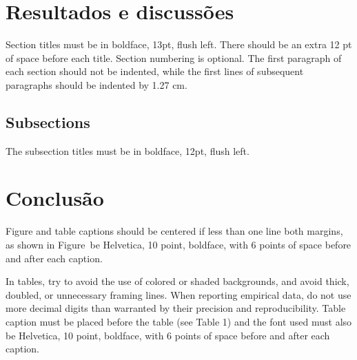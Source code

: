 \documentclass[12pt]{article}
\begin{document}
\section{Resultados e discussões}

Section titles must be in boldface, 13pt, flush left. There should be an extra
12 pt of space before each title. Section numbering is optional. The first
paragraph of each section should not be indented, while the first lines of
subsequent paragraphs should be indented by 1.27 cm.

\subsection{Subsections}

The subsection titles must be in boldface, 12pt, flush left.

\section{Conclusão}\label{sec:figs}

Figure and table captions should be centered if less than one line
both margins, as shown in Figure~be Helvetica, 10 point, boldface, with 6
points of space before and after each caption.%



In tables, try to avoid the use of colored or shaded backgrounds, and avoid
thick, doubled, or unnecessary framing lines. When reporting empirical data, do
not use more decimal digits than warranted by their precision and
reproducibility. Table caption must be placed before the table (see Table 1)
and the font used must also be Helvetica, 10 point, boldface, with 6 points of
space before and after each caption.




\end{document}
